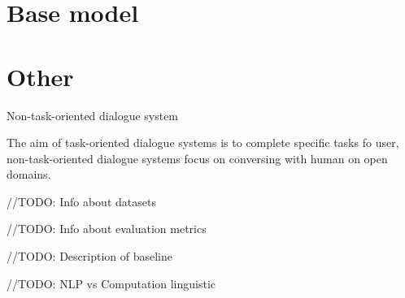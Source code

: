 \chapter{Base model}

\chapter{Other}

Non-task-oriented dialogue system

The aim of task-oriented dialogue systems is to complete specific tasks fo user, non-task-oriented dialogue systems focus on conversing with human on open domains. 

//TODO: Info about datasets

//TODO: Info about evaluation metrics

//TODO: Description of baseline

//TODO: NLP vs Computation linguistic

